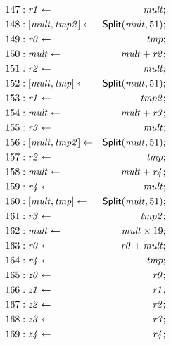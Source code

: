 {\begin{multicols}{2}
\begin{align*}
147 &: \mathit{r1} \leftarrow & \mathit{mult}; \\
148 &: {[}{\mathit{mult}}, {\mathit{tmp2}}{]} \leftarrow & \mbox{\textsf{Split}}(\mathit{mult}, 51); \\
149 &: \mathit{r0} \leftarrow & \mathit{tmp}; \\
150 &: \mathit{mult} \leftarrow & \mathit{mult} + \mathit{r2}; \\
151 &: \mathit{r2} \leftarrow & \mathit{mult}; \\
152 &: {[}{\mathit{mult}}, {\mathit{tmp}}{]} \leftarrow & \mbox{\textsf{Split}}(\mathit{mult}, 51); \\
153 &: \mathit{r1} \leftarrow & \mathit{tmp2}; \\
154 &: \mathit{mult} \leftarrow & \mathit{mult} + \mathit{r3}; \\
155 &: \mathit{r3} \leftarrow & \mathit{mult}; \\
156 &: {[}{\mathit{mult}}, {\mathit{tmp2}}{]} \leftarrow & \mbox{\textsf{Split}}(\mathit{mult}, 51); \\
157 &: \mathit{r2} \leftarrow & \mathit{tmp}; \\
158 &: \mathit{mult} \leftarrow & \mathit{mult} + \mathit{r4}; \\
159 &: \mathit{r4} \leftarrow & \mathit{mult}; \\
160 &: {[}{\mathit{mult}}, {\mathit{tmp}}{]} \leftarrow & \mbox{\textsf{Split}}(\mathit{mult}, 51); \\
161 &: \mathit{r3} \leftarrow & \mathit{tmp2}; \\
162 &: \mathit{mult} \leftarrow & \mathit{mult} \times 19; \\
163 &: \mathit{r0} \leftarrow & \mathit{r0} + \mathit{mult}; \\
164 &: \mathit{r4} \leftarrow & \mathit{tmp}; \\
165 &: \mathit{z0} \leftarrow & \mathit{r0}; \\
166 &: \mathit{z1} \leftarrow & \mathit{r1}; \\
167 &: \mathit{z2} \leftarrow & \mathit{r2}; \\
168 &: \mathit{z3} \leftarrow & \mathit{r3}; \\
169 &: \mathit{z4} \leftarrow & \mathit{r4}; \\
\end{align*}
\end{multicols}
}
